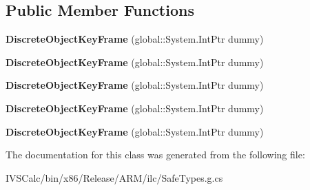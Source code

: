 \subsection*{Public Member Functions}
\begin{DoxyCompactItemize}
\item 
\mbox{\label{class_windows_1_1_u_i_1_1_xaml_1_1_media_1_1_animation_1_1_discrete_object_key_frame_adad00048f35da3ce77293f0c60418118}} 
{\bfseries Discrete\+Object\+Key\+Frame} (global\+::\+System.\+Int\+Ptr dummy)
\item 
\mbox{\label{class_windows_1_1_u_i_1_1_xaml_1_1_media_1_1_animation_1_1_discrete_object_key_frame_adad00048f35da3ce77293f0c60418118}} 
{\bfseries Discrete\+Object\+Key\+Frame} (global\+::\+System.\+Int\+Ptr dummy)
\item 
\mbox{\label{class_windows_1_1_u_i_1_1_xaml_1_1_media_1_1_animation_1_1_discrete_object_key_frame_adad00048f35da3ce77293f0c60418118}} 
{\bfseries Discrete\+Object\+Key\+Frame} (global\+::\+System.\+Int\+Ptr dummy)
\item 
\mbox{\label{class_windows_1_1_u_i_1_1_xaml_1_1_media_1_1_animation_1_1_discrete_object_key_frame_adad00048f35da3ce77293f0c60418118}} 
{\bfseries Discrete\+Object\+Key\+Frame} (global\+::\+System.\+Int\+Ptr dummy)
\item 
\mbox{\label{class_windows_1_1_u_i_1_1_xaml_1_1_media_1_1_animation_1_1_discrete_object_key_frame_adad00048f35da3ce77293f0c60418118}} 
{\bfseries Discrete\+Object\+Key\+Frame} (global\+::\+System.\+Int\+Ptr dummy)
\end{DoxyCompactItemize}


The documentation for this class was generated from the following file\+:\begin{DoxyCompactItemize}
\item 
I\+V\+S\+Calc/bin/x86/\+Release/\+A\+R\+M/ilc/Safe\+Types.\+g.\+cs\end{DoxyCompactItemize}

